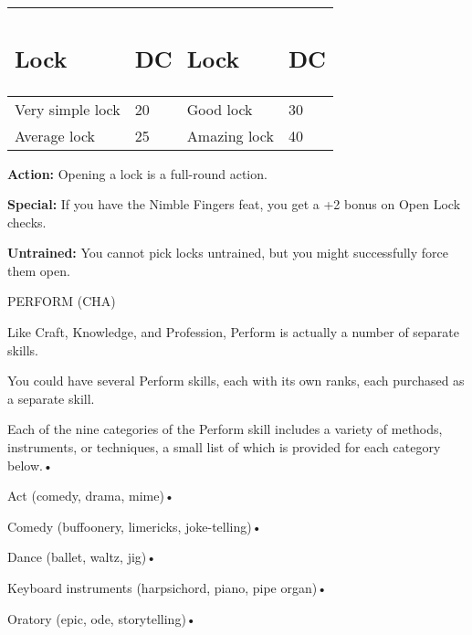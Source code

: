 \documentclass{article}
\begin{document}
\vspace{12pt}
\begin{tabular}{|>{\raggedright}p{67pt}|>{\raggedright}p{13pt}|>{\raggedright}p{55pt}|>{\raggedright}p{13pt}|}
\hline
\subsection*{L\textbf{ock }} & \subsection*{D\textbf{C }} & \subsection*{L\textbf{ock 
}} & \subsection*{D\textbf{C}}\tabularnewline
\hline
Very simple lock  & 20  & Good lock  & 30\tabularnewline
\hline
Average lock &  25  & Amazing lock  & 40\tabularnewline
\hline
\end{tabular}

\vspace{12pt}
\textbf{Action:} Opening a lock is a full-round action.

\textbf{Special:} If you have the Nimble Fingers feat, you get a +2 bonus on Open 
Lock checks.

\textbf{Untrained:} You cannot pick locks untrained, but you might successfully 
force them open.

\vspace{12pt}
PERFORM (CHA)

Like Craft, Knowledge, and Profession, Perform is actually a number of separate 
skills.

You could have several Perform skills, each with its own ranks, each purchased 
as a separate skill.

Each of the nine categories of the Perform skill includes a variety of methods, 
instruments, or techniques, a small list of which is provided for each category 
below.• 

Act (comedy, drama, mime)• 

Comedy (buffoonery, limericks, joke-telling)• 

Dance (ballet, waltz, jig)• 

Keyboard instruments (harpsichord, piano, pipe organ)• 

Oratory (epic, ode, storytelling)• 
\end{document}
